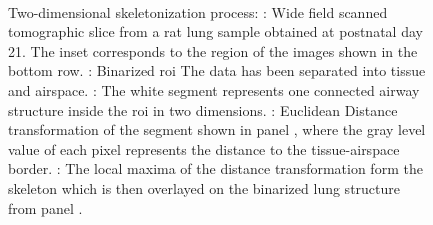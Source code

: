 \begin{figure}
{		\label{subfig:skel-c}%
		}%
	\\%
	\caption[Two-dimensional skeletonization]{Two-dimensional skeletonization process: : Wide field scanned tomographic slice from a rat lung sample obtained at postnatal day 21. The inset corresponds to the region of the images shown in the bottom row. : Binarized \ac{roi} The data has been separated into tissue and airspace. : The white segment represents one connected airway structure inside the \ac{roi} in two dimensions. : Euclidean Distance transformation of the segment shown in panel , where the gray level value of each pixel represents the distance to the tissue-airspace border. : The local maxima of the distance transformation form the skeleton which is then overlayed on the binarized lung structure from panel .}%

\end{figure}
